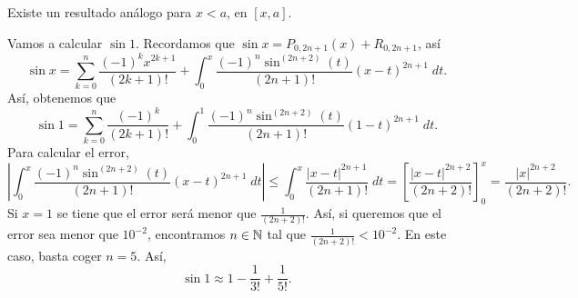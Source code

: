\begin{observation}
	\normalfont Existe un resultado análogo para $\displaystyle x < a $, en $\displaystyle \left[x,a\right]  $.
\end{observation}
\begin{eg}
\normalfont Vamos a calcular $\displaystyle \sin 1 $. Recordamos que $\displaystyle \sin x = P_{0,2n+1}\left(x\right) + R_{0,2n+1} $, así
\[\sin x = \sum^{n}_{k=0}\frac{\left(-1\right)^{k}x^{2k+1}}{\left(2k+1\right)!}+\int^{x}_{0} \frac{\left(-1\right)^{n}\sin ^{\left(2n+2\right)}\left(t\right)}{\left(2n+1\right)!}\left(x-t\right)^{2n+1} \; dt .\]
Así, obtenemos que
\[\sin 1 = \sum^{n}_{k=0}\frac{\left(-1\right)^{k}}{\left(2k+1\right)!} + \int^{1}_{0} \frac{\left(-1\right)^{n}\sin ^{\left(2n+2\right)}\left(t\right)}{\left(2n+1\right)!}\left(1-t\right)^{2n+1} \; dt.\]
Para calcular el error,
\[ \left|\int^{x}_{0} \frac{\left(-1\right)^{n}\sin ^{\left(2n+2\right)}\left(t\right)}{\left(2n+1\right)!}\left(x-t\right)^{2n+1} \; dt \right| \leq \int^{x}_{0} \frac{ \left|x-t\right|^{2n+1}}{\left(2n+1\right)!} \; dt  = \left[\frac{ \left|x-t\right|^{2n+2}}{\left(2n+2\right)!}\right] ^{x}_{0}= \frac{ \left|x\right|^{2n+2}}{\left(2n+2\right)!} .\]
Si $\displaystyle x = 1 $ se tiene que el error será menor que $\displaystyle \frac{1}{\left(2n+2\right)!} $. Así, si queremos que el error sea menor que $\displaystyle 10^{-2} $, encontramos $\displaystyle n \in \mathbb{N}$ tal que $\displaystyle \frac{1}{\left(2n+2\right)!} < 10^{-2} $. En este caso, basta coger $\displaystyle n=5 $. Así,
\[\sin 1 \approx 1 - \frac{1}{3!} + \frac{1}{5!} .\]
\end{eg}

